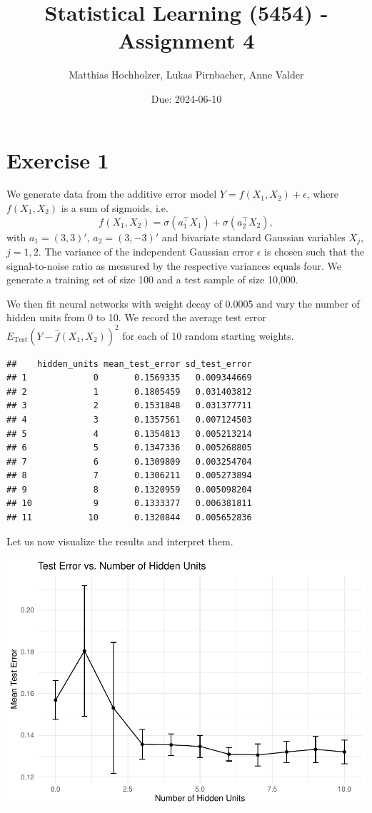 \documentclass[
]{article}
\title{Statistical Learning (5454) - Assignment 4}
\author{Matthias Hochholzer, Lukas Pirnbacher, Anne Valder}
\date{Due: 2024-06-10}
\begin{document}
\maketitle

\section{Exercise 1}\label{exercise-1}

We generate data from the additive error model
\(Y = f(X_1,X_2) + \epsilon\), where \(f(X_1, X_2)\) is a sum of
sigmoids, i.e.
\[ f(X_1,X_2) = \sigma(a_1^\top X_1) + \sigma(a_2^\top X_2), \] with
\(a_1 = (3, 3)'\), \(a_2 = (3,-3)'\) and bivariate standard Gaussian
variables \(X_j\), \(j = 1, 2\). The variance of the independent
Gaussian error \(\epsilon\) is chosen such that the signal-to-noise
ratio as measured by the respective variances equals four. We generate a
training set of size 100 and a test sample of size 10,000.

We then fit neural networks with weight decay of 0.0005 and vary the
number of hidden units from 0 to 10. We record the average test error
\(E_{\text{Test}}(Y - \hat{f}(X_1,X_2))^2\) for each of 10 random
starting weights.

\begin{verbatim}
##    hidden_units mean_test_error sd_test_error
## 1             0       0.1569335   0.009344669
## 2             1       0.1805459   0.031403812
## 3             2       0.1531848   0.031377711
## 4             3       0.1357561   0.007124503
## 5             4       0.1354813   0.005213214
## 6             5       0.1347336   0.005268805
## 7             6       0.1309809   0.003254704
## 8             7       0.1306211   0.005273894
## 9             8       0.1320959   0.005098204
## 10            9       0.1333377   0.006381811
## 11           10       0.1320844   0.005652836
\end{verbatim}

Let us now visualize the results and interpret them.

\includegraphics{A4_files/figure-latex/unnamed-chunk-5-1.pdf}
\end{document}
